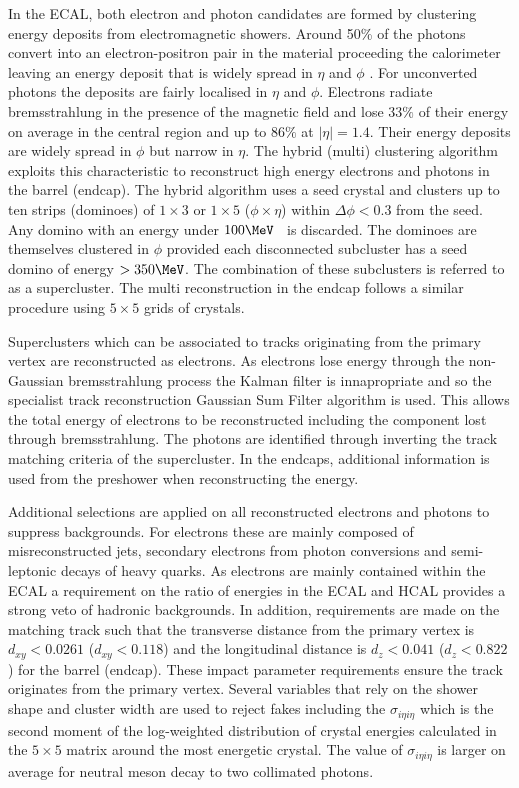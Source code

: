 In the ECAL, both electron and photon candidates are formed by clustering energy deposits
from electromagnetic showers. Around 50\% of the photons convert into an electron-positron pair in the material proceeding the calorimeter
leaving an energy deposit that is widely spread in $\eta$ and $\phi$ \cite{electron_photon_reco}. 
For unconverted photons the deposits are fairly localised in $\eta$ and $\phi$. Electrons radiate
bremsstrahlung in the presence of the magnetic field and lose $33\%$ of their energy on average
in the central region and up to $86\%$ at $|\eta| = 1.4$. Their energy deposits are widely spread
in $\phi$ but narrow in $\eta$. The hybrid (multi) clustering algorithm exploits this characteristic to
reconstruct high energy electrons and photons in the barrel (endcap). The hybrid algorithm
uses a seed crystal and clusters up to ten strips (dominoes) of $1\times3$ or $1\times5$ ($\phi\times\eta$) within 
$\Delta\phi < 0.3$ from the seed. Any domino with an energy under $100\MeV$ ~is discarded. The dominoes
are themselves clustered in $\phi$ provided each disconnected subcluster has a seed domino of energy $>350\MeV$.
The combination of these subclusters is referred to as a supercluster. The multi reconstruction in the endcap 
follows a similar procedure using $5\times5$ grids of crystals. 

Superclusters which can be associated to tracks originating from the primary vertex are reconstructed as electrons.
As electrons lose energy through the non-Gaussian bremsstrahlung process the Kalman filter is innapropriate and
so the specialist track reconstruction Gaussian Sum Filter algorithm is used. This allows the total energy of
electrons to be reconstructed including the component lost through bremsstrahlung. The photons are identified 
through inverting the track matching criteria of the supercluster. In the endcaps, additional information
is used from the preshower when reconstructing the energy.

Additional selections are applied on all reconstructed electrons and photons to suppress backgrounds.
For electrons these are mainly composed of misreconstructed jets, secondary electrons from photon
conversions and semi-leptonic decays of heavy quarks. As electrons are mainly contained within 
the ECAL a requirement on the ratio of energies in the ECAL and HCAL provides a strong veto of hadronic
backgrounds. In addition, requirements are made on the matching track such that the transverse distance from 
the primary vertex is $d_{xy} < 0.0261$ ($d_{xy} < 0.118$) and the longitudinal distance is $d_z < 0.041$
($d_z < 0.822$) for the barrel (endcap). These impact parameter requirements ensure the track originates from 
the primary vertex. Several variables that rely on the shower shape and cluster
width are used to reject fakes including the $\sigma_{i\eta i\eta}$ which is the second moment of the log-weighted
distribution of crystal energies calculated in the $5\times5$ matrix around the most energetic crystal. The value of
 $\sigma_{i\eta i\eta}$ is larger on average for neutral meson decay to two collimated photons.

